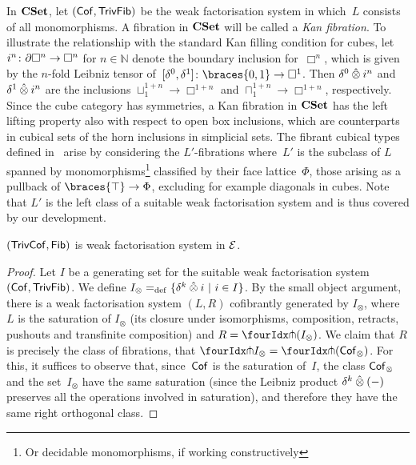 \documentclass[reqno,10pt,a4paper,oneside,draft]{amsart}
\begin{document}
\begin{example}
In $\CSet$, let $(\Cof, \TrivFib)$ be the weak factorisation system in which~$L$  consists of all monomorphisms.
A  fibration in $\CSet$ will be called a \emph{Kan fibration}.
To illustrate the relationship with the standard Kan filling condition for cubes, let $i^n \co \partial \Box^n \to \Box^n$ for $n \in \mathbb{N}$ denote the boundary inclusion for~$\Box^n$, which is given by the $n$-fold Leibniz tensor of~$[\lcyl, \rcyl] \co \braces{0, 1} \to \Box^1$.
Then $\lcyl \hatotimes i^n$ and $\rcyl \hatotimes i^n$ are the inclusions $\sqcup_1^{1+n} \to \Box^{1+n}$ and $\sqcap_1^{1+n} \to \Box^{1+n}$, respectively.
Since the cube category has symmetries, a Kan fibration in $\CSet$  has the left lifting property also with respect to open box inclusions, which are counterparts in cubical sets of the horn inclusions in simplicial sets.
The fibrant cubical types defined in~\cite{cohen-et-al:cubicaltt} arise by considering the  $L'$-fibrations where~$L'$ is the
subclass of $L$ spanned by monomorphisms\footnote{Or decidable monomorphisms, if working constructively} classified by their face lattice~$\Phi$, \ie those arising as a pullback of $\braces{\top} \to \Phi$, excluding for example diagonals in cubes.
Note that  $L'$ is the left class of a suitable weak factorisation system and is thus covered by our development.
\end{example}

 
\begin{proposition} \label{thm:wfstimes} $(\TrivCof, \Fib)$ is weak factorisation system in $\cal{E}$.
\end{proposition}

\begin{proof} Let $I$ be a generating set for the suitable weak factorisation system $(\Cof, \TrivFib)$.
We  define $I_\otimes \defeq \{ \delta^k \hatotimes i \ | \ i \in I \}$. By the small object argument, 
there is a weak factorisation system $(L, R)$ cofibrantly generated by $I_\otimes$, where
$L$ is the saturation of $I_\otimes$ (\ie its closure under isomorphisms, composition, retracts, pushouts and transfinite composition) 
and $R = \liftr{(I_\otimes)}$. 
We claim that $R$ is precisely the class of
fibrations, \ie that $\liftr{I_\otimes} = \liftr{(\Cof_\otimes)}$. For this, it suffices to observe that, since~$\Cof$ is the saturation of~$I$, the class
$\Cof_\otimes$ and the set~$I_\otimes$ have the same saturation (since the Leibniz product $\kcyl \hatotimes (-)$ preserves all the operations involved in saturation), and therefore they have the same right orthogonal class.
\end{proof}
\end{document}
